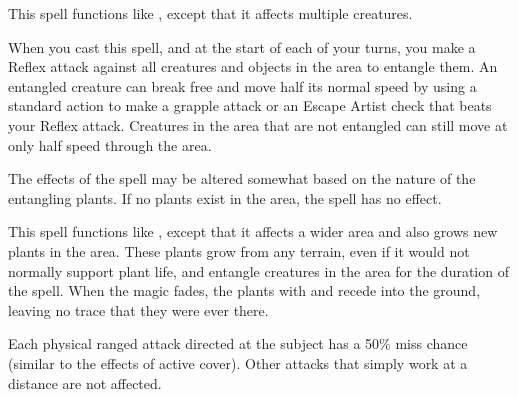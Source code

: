 \spellrng{\rngmed}
\begin{spelleffect}
  This spell functions like , except that it affects multiple creatures.
\end{spelleffect}

\spellrng{\rngmed}
\begin{spelleffect}
    When you cast this spell, and at the start of each of your turns, you make a Reflex attack against all creatures and objects in the area to entangle them. An entangled creature can break free and move half its normal speed by using a standard action to make a grapple attack or an Escape Artist check that beats your Reflex attack. Creatures in the area that are not entangled can still move at only half speed through the area.
\end{spelleffect}
\begin{spellnotes}
  The effects of the spell may be altered somewhat based on the nature of the entangling plants. If no plants exist in the area, the spell has no effect.
\end{spellnotes}

\begin{spelleffect}
  This spell functions like , except that it affects a wider area and also grows new plants in the area. These plants grow from any terrain, even if it would not normally support plant life, and entangle creatures in the area for the duration of the spell. When the magic fades, the plants with and recede into the ground, leaving no trace that they were ever there.
\end{spelleffect}

\begin{spelleffect}
  Each physical ranged attack directed at the subject has a 50\% miss chance (similar to the effects of active cover). Other attacks that simply work at a distance are not affected.
\end{spelleffect}

